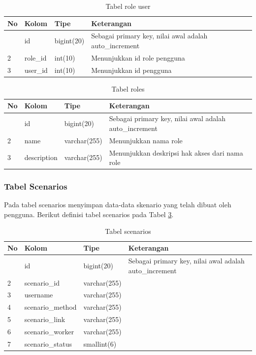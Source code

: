 				\begin{longtable}{|p{}|p{}|p{}|p{}|}
					\caption{Tabel role user} \label{tabelroleuser} \\
					\hline
					\textbf{No} & \textbf{Kolom} & \textbf{Tipe} & \textbf{Keterangan} \\ \hline
					\endhead
					\endfoot
					\endlastfoot
					1 & id & bigint(20) & Sebagai primary key, nilai awal adalah auto\_increment \\ \hline
					2 & role\_id & int(10) & Menunjukkan id role pengguna \\ \hline
					3 & user\_id & int(10) & Menunjukkan id pengguna \\ \hline
				\end{longtable}
				
				\begin{longtable}{|p{}|p{}|p{}|p{}|}
					\caption{Tabel roles} \label{tabelroles} \\
					\hline
					\textbf{No} & \textbf{Kolom} & \textbf{Tipe} & \textbf{Keterangan} \\ \hline
					\endhead
					\endfoot
					\endlastfoot
					1 & id & bigint(20) & Sebagai primary key, nilai awal adalah auto\_increment \\ \hline
					2 & name & varchar(255) & Menunjukkan nama role \\ \hline
					3 & description & varchar(255) & Menunjukkan deskripsi hak akses dari nama role \\ \hline
				\end{longtable}
		
			\subsubsection{Tabel Scenarios}
				Pada tabel scenarios menyimpan data-data skenario yang telah dibuat oleh pengguna. Berikut definisi tabel scenarios pada Tabel \ref{tabelscenarios}.
			
				\begin{longtable}{|p{}|p{}|p{}|p{}|}
					\caption{Tabel scenarios} \label{tabelscenarios} \\
					\hline
					\textbf{No} & \textbf{Kolom} & \textbf{Tipe} & \textbf{Keterangan} \\ \hline
					\endhead
					\endfoot
					\endlastfoot
					1 & id & bigint(20) & Sebagai primary key, nilai awal adalah auto\_increment \\ \hline
					2 & scenario\_id & varchar(255) &  \\ \hline
					3 & username & varchar(255) &  \\ \hline
					4 & scenario\_method & varchar(255) &  \\ \hline
					5 & scenario\_link & varchar(255) &  \\ \hline
					6 & scenario\_worker & varchar(255) &  \\ \hline
					7 & scenario\_status & smallint(6) &  \\ \hline
				\end{longtable}
		

